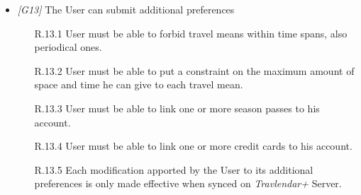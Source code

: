 \begin{itemize}
	\item \textit{[G13]} The User can submit additional preferences
		\begin{itemize}
			\item[R.13.1] User must be able to forbid travel means within time spans, also periodical ones.
			\item[R.13.2] User must be able to put a constraint on the maximum amount of space and time he can give to each travel mean.
			\item[R.13.3] User must be able to link one or more season passes to his account.
			\item[R.13.4] User must be able to link one or more credit cards to his account.
			\item[R.13.5] Each modification apported by the User to its additional preferences is only made effective when synced on \textit{Travlendar+} Server.
		\end{itemize}
		
\end{itemize}
            
\vfill

